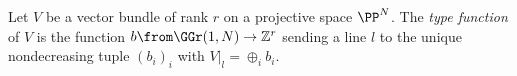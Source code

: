 \begin{definition}
	Let $V$ be a vector bundle of rank $r$ on a projective space $\PP^N$. The \emph{type function} of $V$ is the function
	$b\from \GGr(1,N) \to \mathbb{Z}^r$ sending a line $l$ to the unique nondecreasing tuple $(b_i)_i$ with $V|_l = \oplus_i b_i$. 
\end{definition}